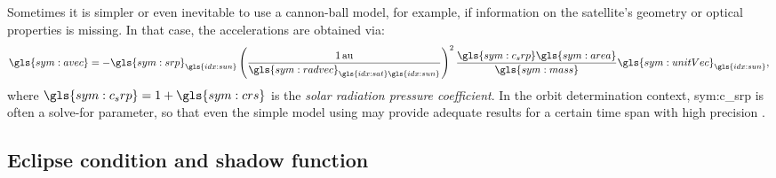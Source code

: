 Sometimes it is simpler or even inevitable to use a cannon-ball model, for example, if information on the satellite's geometry or optical properties is missing. In that case, the
accelerations are obtained via:
\begin{equation}
 \gls{sym:avec} =
-\gls{sym:srp}_{\gls{idx:sun}}\left(\frac{\SI{1}{\astronomicalunit}}{\gls{sym:radvec}_{\gls{idx:sat}\gls{idx:sun}}}\right)^2\frac{\gls{sym:c_srp}\gls{sym:area}}{\gls{sym:mass}}\gls
{sym:unitVec}_{\gls{idx:sun}}, \label{eq:srpacc-simple}
\end{equation}
where $\gls{sym:c_srp} = 1 + \gls{sym:crs}$ is the \textit{solar radiation pressure coefficient}. In the orbit determination context, \gls{sym:c_srp} is often a solve-for
parameter, so that even the simple model using  may provide adequate results for a certain time span with high precision \citep{montenbruck2000}.

\subsection{Eclipse condition and shadow function}
\label{sec:propagation-state-srp-shadow}

